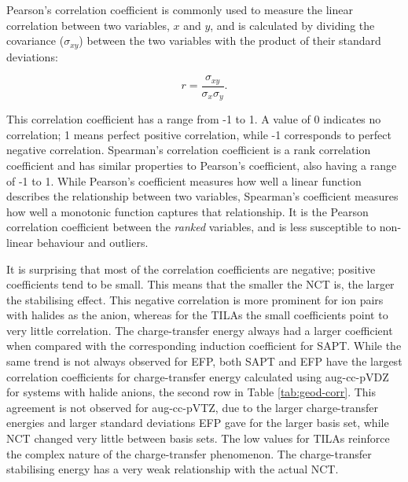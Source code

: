 Pearson's correlation coefficient is commonly used to measure the linear correlation between two variables, $x$ and $y$, and is calculated by dividing the covariance ($\sigma_{xy}$) between the two variables with the product of their standard deviations:

\begin{equation}
    r = \frac{\sigma_{xy}}{\sigma_x \sigma_y}.
\end{equation}

This correlation coefficient has a range from -1 to 1.
A value of 0 indicates no correlation; 1 means perfect positive correlation, while -1 corresponds to perfect negative correlation.
Spearman's correlation coefficient is a rank correlation coefficient and has similar properties to Pearson's coefficient, also having a range of -1 to 1. 
While Pearson's coefficient measures how well a linear function describes the relationship between two variables, Spearman's coefficient measures how well a monotonic function captures that relationship.
It is the Pearson correlation coefficient between the \emph{ranked} variables, and is less susceptible to non-linear behaviour and outliers.


It is surprising that most of the correlation coefficients are negative; positive coefficients tend to be small.
This means that the smaller the NCT is, the larger the stabilising effect.
This negative correlation is more prominent for ion pairs with halides as the anion, whereas for the TILAs the small coefficients point to very little correlation.
The charge-transfer energy always had a larger coefficient when compared with the corresponding induction coefficient for SAPT.
While the same trend is not always observed for EFP, both SAPT and EFP have the largest correlation coefficients for charge-transfer energy calculated using aug-cc-pVDZ for systems with halide anions, the second row in Table \ref{tab:geod-corr}.
This agreement is not observed for aug-cc-pVTZ, due to the larger charge-transfer energies and larger standard deviations EFP gave for the larger basis set, while NCT changed very little between basis sets.
The low values for TILAs reinforce the complex nature of the charge-transfer phenomenon.
The charge-transfer stabilising energy has a very weak relationship with the actual NCT.

